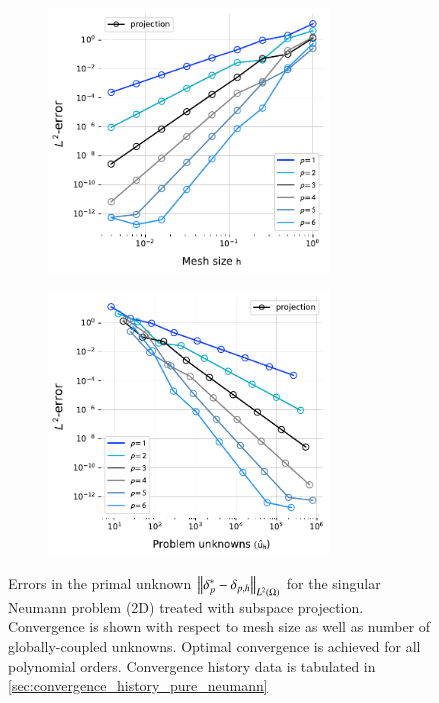 \begin{figure}[ht]
    \centering
    \begin{subfigure}{0.45\textwidth}
        \includegraphics[height=7cm]{img/PNP_conv_2D.pdf}
    \end{subfigure}
    \begin{subfigure}{0.45\textwidth}
        \includegraphics[height=7cm]{img/PNP_conv_2D_dofs.pdf}
    \end{subfigure}
    \caption{Errors in the primal unknown $\left\lVert \delta_p^* - \delta_{p,h} \right\rVert_{L^2(\Omega)} $ for the singular Neumann problem (2D) treated with subspace projection. Convergence is shown with respect to mesh size as well as number of globally-coupled unknowns. Optimal convergence is achieved for all polynomial orders.
    Convergence history data is tabulated in \ref{sec:convergence_history_pure_neumann}}
    \label{fig:INS:convergence_singular_system_projection}
\end{figure}

